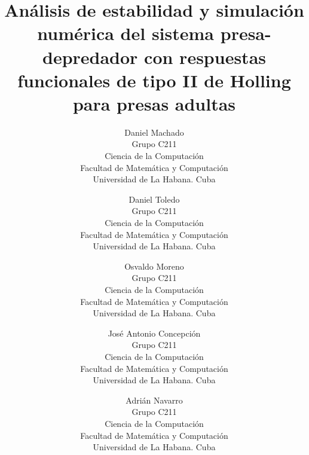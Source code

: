 \documentclass{wscpaperproc}
\theoremstyle{wsc}
\begin{document}

\title{An\'alisis de estabilidad y simulaci\'on num\'erica del sistema presa-depredador con respuestas funcionales de tipo II de Holling para presas adultas}

\author{
	Daniel Machado \\[12pt]
	Grupo C211\\
	Ciencia de la Computaci\'on\\
	Facultad de Matem\'atica y Computaci\'on\\
	Universidad de La Habana. Cuba\\
	\and
	Daniel Toledo\\[12pt]
	Grupo C211\\
	Ciencia de la Computaci\'on\\
	Facultad de Matem\'atica y Computaci\'on\\
	Universidad de La Habana. Cuba\\
	\and
	Osvaldo Moreno\\[12pt]
	Grupo C211\\
	Ciencia de la Computaci\'on\\
	Facultad de Matem\'atica y Computaci\'on\\
	Universidad de La Habana. Cuba\\
	\and
	Jos\'e Antonio Concepci\'on\\[12pt]
	Grupo C211\\
	Ciencia de la Computaci\'on\\
	Facultad de Matem\'atica y Computaci\'on\\
	Universidad de La Habana. Cuba\\
	\and
	Adri\'an Navarro\\[12pt]
	Grupo C211\\
	Ciencia de la Computaci\'on\\
	Facultad de Matem\'atica y Computaci\'on\\
	Universidad de La Habana. Cuba\\
}



\maketitle
\end{document}
